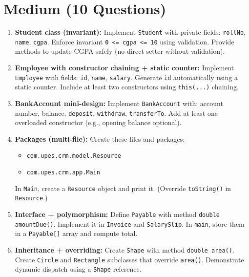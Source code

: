 \documentclass[11pt,a4paper]{article}
\begin{document}
\section*{Medium (10 Questions)}
\begin{enumerate}[label=M\arabic*., leftmargin=*]
  \item \textbf{Student class (invariant):} Implement \texttt{Student} with private fields:
    \texttt{rollNo}, \texttt{name}, \texttt{cgpa}. Enforce invariant \texttt{0 <= cgpa <= 10} using validation.
    Provide methods to update CGPA safely (no direct setter without validation).

  \item \textbf{Employee with constructor chaining + static counter:} Implement \texttt{Employee} with fields:
    \texttt{id}, \texttt{name}, \texttt{salary}. Generate \texttt{id} automatically using a static counter.
    Include at least two constructors using \texttt{this(...)} chaining.

  \item \textbf{BankAccount mini-design:} Implement \texttt{BankAccount} with:
    account number, balance, \texttt{deposit}, \texttt{withdraw}, \texttt{transferTo}.
    Add at least one overloaded constructor (e.g., opening balance optional).

  \item \textbf{Packages (multi-file):} Create these files and packages:
    \begin{itemize}[leftmargin=*]
      \item \texttt{com.upes.crm.model.Resource}
      \item \texttt{com.upes.crm.app.Main}
    \end{itemize}
    In \texttt{Main}, create a \texttt{Resource} object and print it.
    (Override \texttt{toString()} in \texttt{Resource}.)

  \item \textbf{Interface + polymorphism:} Define \texttt{Payable} with method \texttt{double amountDue()}.
    Implement it in \texttt{Invoice} and \texttt{SalarySlip}. In \texttt{main}, store them in a \texttt{Payable[]} array and compute total.

  \item \textbf{Inheritance + overriding:} Create \texttt{Shape} with method \texttt{double area()}.
    Create \texttt{Circle} and \texttt{Rectangle} subclasses that override \texttt{area()}.
    Demonstrate dynamic dispatch using a \texttt{Shape} reference.


\end{enumerate}
\end{document}

